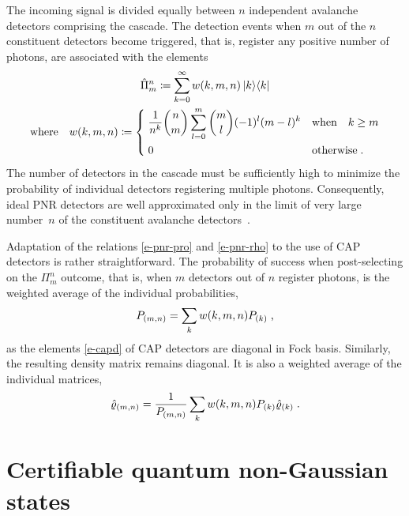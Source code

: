 \documentclass{article}
\begin{document}
The incoming signal is divided equally between $n$ independent avalanche detectors comprising the cascade. The detection events when $m$ out of the $n$ constituent detectors become triggered, that is, register any positive number of photons, are associated with the elements~\cite{paul1996}
%
\begin{equation}\label{e-capd}
  \begin{gathered}
  \hat{\Pi}_{m}^{n} 
    \coloneqq \sum_{k = 0}^{\infty} w(k, m, n) \ketbra{k}{k} \\
  \text{where} \quad
  w(k, m, n) 
    \coloneqq 
    \begin{dcases}
      \; \frac{1}{n^{k}} \binom{n}{m} \sum_{l = 0}^{m} \binom{m}{l} (-1)^{l} (m - l)^{k} 
      & \text{when}\quad k \geq m \\
      \; 0 & \text{otherwise} \Qd
    \end{dcases}
  \end{gathered}
\end{equation} 
%
The number of detectors in the cascade must be sufficiently high to minimize the probability of individual detectors registering multiple photons. Consequently, ideal PNR detectors are well approximated only in the limit of very large number~$n$ of the constituent avalanche detectors~\cite{provaznik2020}.

Adaptation of the relations \eqref{e-pnr-pro} and \eqref{e-pnr-rho} to the use of CAP detectors is rather straightforward. The probability of success when post-selecting on the $\Pi_{m}^{n}$ outcome, that is, when $m$ detectors out of $n$ register photons, is the weighted average of the individual probabilities,
%
\begin{equation}\label{e-cap-pro}
  P_{(m, n)} = \sum_{k} w(k, m, n) P_{(k)} \;\text{,}
\end{equation}
%
as the elements \eqref{e-capd} of CAP detectors are diagonal in Fock basis. Similarly, the resulting density matrix remains diagonal. It is also a weighted average of the individual matrices,
\begin{equation}\label{e-cap-rho}
  \hat{\varrho}_{(m, n)} =
    \frac{1}{P_{(m, n)}}
    \sum_{k} w(k, m, n) 
      P_{(k)} \hat{\varrho}_{(k)}
  \;\text{.}
\end{equation}

%
%

\section{Certifiable quantum non-Gaussian states}
\end{document}
